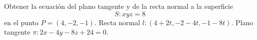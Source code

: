 
{Obtener la ecuación del plano tangente y de la recta normal a la superficie 
\[
S:xyz=8
\]
en el punto $P=(4,-2,-1)$.
}
{Recta normal $l:(4+2t,-2-4t,-1-8t)$. Plano tangente $\pi: 2x-4y-8z+24=0$. 
}
{
}
